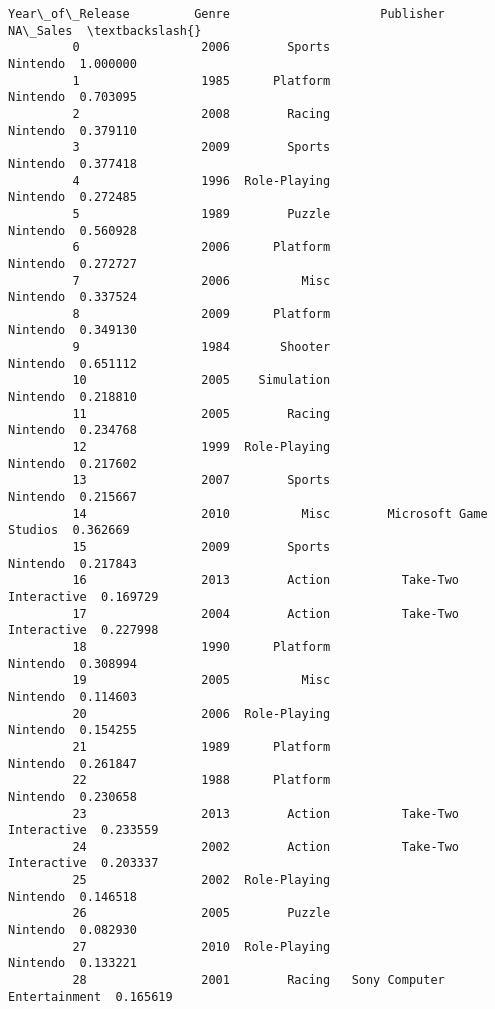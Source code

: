 \documentclass[11pt]{article}
\begin{document}
\begin{Verbatim}[commandchars=\\\{\}]
                Year\_of\_Release         Genre                     Publisher  NA\_Sales  \textbackslash{}
         0                 2006        Sports                      Nintendo  1.000000   
         1                 1985      Platform                      Nintendo  0.703095   
         2                 2008        Racing                      Nintendo  0.379110   
         3                 2009        Sports                      Nintendo  0.377418   
         4                 1996  Role-Playing                      Nintendo  0.272485   
         5                 1989        Puzzle                      Nintendo  0.560928   
         6                 2006      Platform                      Nintendo  0.272727   
         7                 2006          Misc                      Nintendo  0.337524   
         8                 2009      Platform                      Nintendo  0.349130   
         9                 1984       Shooter                      Nintendo  0.651112   
         10                2005    Simulation                      Nintendo  0.218810   
         11                2005        Racing                      Nintendo  0.234768   
         12                1999  Role-Playing                      Nintendo  0.217602   
         13                2007        Sports                      Nintendo  0.215667   
         14                2010          Misc        Microsoft Game Studios  0.362669   
         15                2009        Sports                      Nintendo  0.217843   
         16                2013        Action          Take-Two Interactive  0.169729   
         17                2004        Action          Take-Two Interactive  0.227998   
         18                1990      Platform                      Nintendo  0.308994   
         19                2005          Misc                      Nintendo  0.114603   
         20                2006  Role-Playing                      Nintendo  0.154255   
         21                1989      Platform                      Nintendo  0.261847   
         22                1988      Platform                      Nintendo  0.230658   
         23                2013        Action          Take-Two Interactive  0.233559   
         24                2002        Action          Take-Two Interactive  0.203337   
         25                2002  Role-Playing                      Nintendo  0.146518   
         26                2005        Puzzle                      Nintendo  0.082930   
         27                2010  Role-Playing                      Nintendo  0.133221   
         28                2001        Racing   Sony Computer Entertainment  0.165619   

\end{Verbatim}
\end{document}
